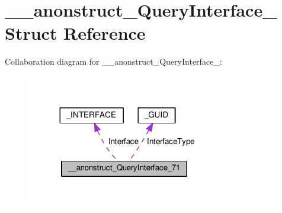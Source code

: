 \hypertarget{struct____anonstruct__QueryInterface__71}{}\section{\+\_\+\+\_\+anonstruct\+\_\+\+Query\+Interface\+\_ Struct Reference}
\label{struct____anonstruct__QueryInterface__71}


Collaboration diagram for \+\_\+\+\_\+anonstruct\+\_\+\+Query\+Interface\+\_\+:
\nopagebreak
\begin{figure}[H]
\begin{center}
\leavevmode
\includegraphics[width=251pt]{struct____anonstruct__QueryInterface__71__coll__graph}
\end{center}
\end{figure}
